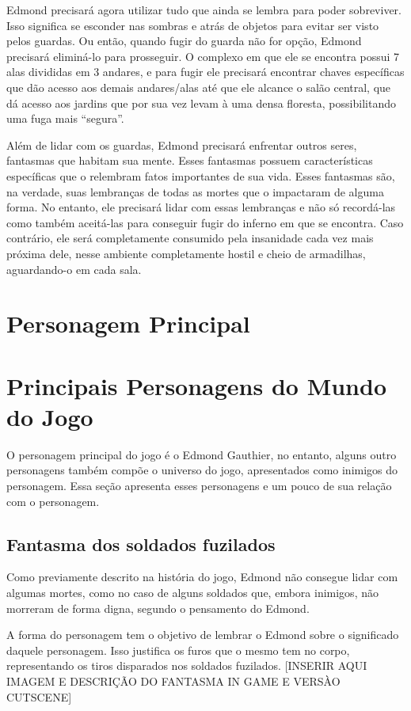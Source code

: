 \documentclass{article}
\begin{document}
    Edmond precisará agora utilizar tudo que ainda se lembra para poder sobreviver. Isso significa se esconder nas sombras e atrás de objetos para evitar ser visto pelos guardas. Ou então, quando fugir do guarda não for opção, Edmond precisará eliminá-lo para prosseguir. O complexo em que ele se encontra possui 7 alas divididas em 3 andares, e para fugir ele precisará encontrar chaves específicas que dão acesso aos demais andares/alas até que ele alcance o salão central, que dá acesso aos jardins que por sua vez levam à uma densa floresta, possibilitando uma fuga mais “segura”.
    
    Além de lidar com os guardas, Edmond precisará enfrentar outros seres, fantasmas que habitam sua mente. Esses fantasmas possuem características específicas que o relembram fatos importantes de sua vida. Esses fantasmas são, na verdade, suas lembranças de todas as mortes que o impactaram de alguma forma. No entanto, ele precisará lidar com essas lembranças e não só recordá-las como também aceitá-las para conseguir fugir do inferno em que se encontra. Caso contrário, ele será completamente consumido pela insanidade cada vez mais próxima dele, nesse ambiente completamente hostil e cheio de armadilhas, aguardando-o em cada sala. 

\section{Personagem Principal}

\section{Principais Personagens do Mundo do Jogo}
O personagem principal do jogo é o Edmond Gauthier, no entanto, alguns outro personagens também compõe o universo do jogo, apresentados como inimigos do personagem. Essa seção apresenta esses personagens e um pouco de sua relação com o personagem.

\subsection{Fantasma dos soldados fuzilados}
Como previamente descrito na história do jogo, Edmond não consegue lidar com algumas mortes, como no caso de alguns soldados que, embora inimigos, não morreram de forma digna, segundo o pensamento do Edmond. 
	
	A forma do personagem tem o objetivo de lembrar o Edmond sobre o significado daquele personagem. Isso justifica os furos que o mesmo tem no corpo, representando os tiros disparados nos soldados fuzilados. [INSERIR AQUI IMAGEM E DESCRIÇÃO DO FANTASMA IN GAME E VERSÀO CUTSCENE]
	
\end{document}
